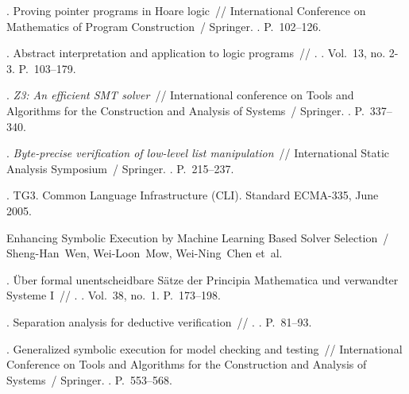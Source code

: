 \begin{thebibliography}{32}
. Proving pointer programs in Hoare logic~//
  International Conference on Mathematics of Program Construction~/ Springer.
  \BibDash
{}. \BibDash
\newblock P.~102--126.

. Abstract interpretation and
  application to logic programs~// .
  \BibDash
{}. \BibDash
\newblock Vol.~13, no. 2-3. \BibDash
\newblock P.~103--179.

. \textit{Z3: An efficient SMT
  solver}~// International conference on Tools and Algorithms for the
  Construction and Analysis of Systems~/ Springer. \BibDash
{}. \BibDash
\newblock P.~337--340.

.
  \textit{Byte-precise verification of low-level list manipulation}~//
  International Static Analysis Symposium~/ Springer. \BibDash
{}. \BibDash
\newblock P.~215--237.

. TG3. Common Language Infrastructure (CLI). Standard
  ECMA-335, June 2005.

Enhancing Symbolic Execution by Machine Learning Based Solver Selection~/
  Sheng-Han~Wen, Wei-Loon~Mow, Wei-Ning~Chen et~al.

. {\"U}ber formal unentscheidbare S{\"a}tze der
  Principia Mathematica und verwandter Systeme I~// . \BibDash
{}. \BibDash
\newblock Vol.~38, no.~1. \BibDash
\newblock P.~173--198.

. Separation analysis for deductive
  verification~// . \BibDash
{}. \BibDash
\newblock P.~81--93.

.
  Generalized symbolic execution for model checking and testing~//
  International Conference on Tools and Algorithms for the Construction and
  Analysis of Systems~/ Springer. \BibDash
{}. \BibDash
\newblock P.~553--568.


\end{thebibliography}
